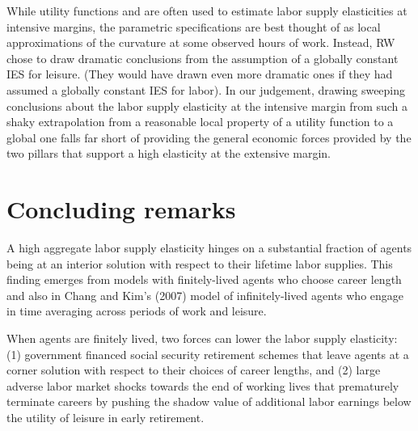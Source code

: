 While utility functions  and  are often
used to estimate labor supply elasticities at intensive margins,
the parametric specifications are best thought of as local
approximations of the curvature at some
observed hours of work. Instead, RW  chose to draw dramatic conclusions from
the assumption of a globally constant IES for
leisure. (They would have drawn even more dramatic ones if  they had assumed a globally
constant IES for labor).
In our judgement, drawing sweeping conclusions about the labor supply elasticity at the intensive margin
from such a shaky extrapolation from a reasonable local  property of a utility function to a global one falls
far short of providing the general economic forces provided by the two  pillars that support a high elasticity at the
extensive margin.











\section{Concluding remarks}

A high aggregate labor supply elasticity hinges on a substantial
fraction of agents being at an interior solution with respect to their lifetime labor supplies.
This finding emerges  from models with
finitely-lived agents who choose career length and also
in Chang and Kim's (2007) model of infinitely-lived agents
who engage in time averaging across periods of work and leisure.

 When agents are finitely lived, two forces  can lower the labor supply
elasticity: (1) government financed
social security retirement schemes that leave agents at a corner
solution with respect to their choices of career lengths,  and (2)  large adverse
labor market shocks towards the end of working lives that
prematurely terminate careers by pushing  the shadow value of additional labor earnings  below the utility
of leisure in early retirement.


